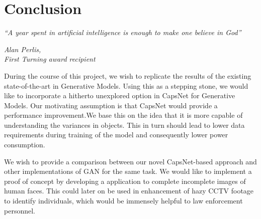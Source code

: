 \chapter{Conclusion}\label{ch:conclusion}
\epigraph{\textit{\normalsize “A year spent in artificial intelligence is enough to make one believe in God”}}{\textit{ \normalsize Alan Perlis,\\ First Turning award recipient}}
During the course of this project, we wish to replicate the results of the existing state-of-the-art in Generative Models. Using this as a stepping stone, we would like to incorporate a hitherto unexplored option in CapsNet for Generative Models. Our motivating assumption is that CapsNet would provide a performance improvement.We base this on the idea that it is more capable of understanding the variances in objects. This in turn should lead to lower data requirements during training of the model and consequently lower power consumption. 

\par\bigskip We wish to provide a comparison between our novel CapsNet-based approach and other implementations of GAN for the same task. We would like to implement a proof of concept by developing a application to complete incomplete images of human faces. This could later on be used in enhancement of hazy CCTV footage to identify individuals, which would be immensely helpful to law enforcement personnel.

